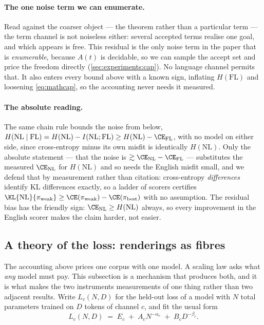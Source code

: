 \paragraph{The one noise term we can enumerate.}
Read against the coarser object --- the theorem rather than a particular term ---
the term channel is not noiseless either:
several accepted terms realise one goal, and which appears is free.
This residual is the only noise term in the paper that is \emph{enumerable},
because \(A(t)\) is decidable, so we can sample the accept set and price the
freedom directly (\cref{sec:experiments:cap}).
No language channel permits that.
It also enters every bound above with a known sign, inflating
\(H(\mathrm{FL})\) and loosening \cref{eq:mathcap}, so the accounting never
needs it measured.

\paragraph{The absolute reading.}
The same chain rule bounds the noise from below,
\(H(\mathrm{NL}\mid\mathrm{FL}) = H(\mathrm{NL}) - I(\mathrm{NL};\mathrm{FL})
\ge H(\mathrm{NL}) - \CE_{\mathrm{FL}}\),
with no model on either side, since cross-entropy minus its own misfit is
identically \(H(\mathrm{NL})\).
Only the absolute statement --- that the noise is
\(\gtrsim \CE_{\mathrm{NL}} - \CE_{\mathrm{FL}}\) --- substitutes the measured
\(\CE_{\mathrm{NL}}\) for \(H(\mathrm{NL})\) and so needs the English misfit
small, and we defend that by measurement rather than citation:
cross-entropy \emph{differences} identify KL differences exactly, so a ladder of
scorers certifies \(\KL{\mathrm{NL}}{\pi_{\mathrm{weak}}} \ge
\CE(\pi_{\mathrm{weak}}) - \CE(\pi_{\mathrm{best}})\) with no assumption.
The residual bias has the friendly sign:
\(\CE_{\mathrm{NL}} \ge H(\mathrm{NL})\) always, so every improvement in the
English scorer makes the claim harder, not easier.

\subsection{A theory of the loss: renderings as fibres}
\label{sec:method:scaling}

The accounting above prices one corpus with one model.
A scaling law asks what \emph{any} model must pay.
This subsection is a mechanism that produces both, and it is what makes the two
instruments measurements of one thing rather than two adjacent results.
Write \(L_c(N,D)\) for the held-out loss of a model with \(N\) total
parameters trained on \(D\) tokens of channel \(c\), and fit the usual form 
\citep{kaplan2020scaling, hoffmann2022chinchilla}
\begin{equation}
\label{eq:chinchilla}
  L_c(N,D) \;=\; E_c \;+\; A_c N^{-\alpha_c} \;+\; B_c D^{-\beta_c}.
\end{equation}

